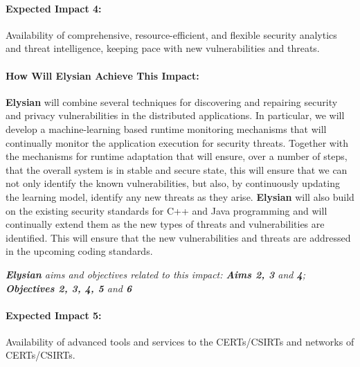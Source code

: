 \documentclass[a4paper,11pt]{article}
\newcommand{\project}[1]{\textbf{#1}\xspace}
\newcommand{\SECURITY}{\project{Elysian}}
\newcommand{\TheProject}{\SECURITY}
\begin{document}
\begin{mdframed}[backgroundcolor=blue!5]
\paragraph{Expected Impact 4:}
Availability of comprehensive, resource-efficient, and flexible security analytics and threat intelligence, keeping pace with new vulnerabilities and threats.
\end{mdframed}

\begin{mdframed}[backgroundcolor=gray!10]
\paragraph{How Will \TheProject{} Achieve This Impact:}
\TheProject{} will combine several techniques for discovering and repairing security and privacy vulnerabilities in the distributed applications. In particular, we will develop a machine-learning based runtime monitoring mechanisms that will continually monitor the application execution for security threats. Together with the mechanisms for runtime adaptation that will ensure, over a number of steps, that the overall system is in stable and secure state, this will ensure that we can not only identify the known vulnerabilities, but also, by continuously updating the learning model, identify any new threats as they arise. \TheProject{} will also build on the existing security standards for C++ and Java programming and will continually extend them as the new types of threats and vulnerabilities are identified. This will ensure that the new vulnerabilities and threats are addressed in the upcoming coding standards. 

\emph{\TheProject{} aims and objectives related to this impact: \textbf{Aims 2, 3}  and \textbf{4}; \textbf{Objectives 2, 3, 4, 5} and \textbf{6} }


\end{mdframed}

\begin{mdframed}[backgroundcolor=blue!5]
\paragraph{Expected Impact 5:}
Availability of advanced tools and services to the CERTs/CSIRTs and networks of CERTs/CSIRTs.
\end{mdframed}
\end{document}
